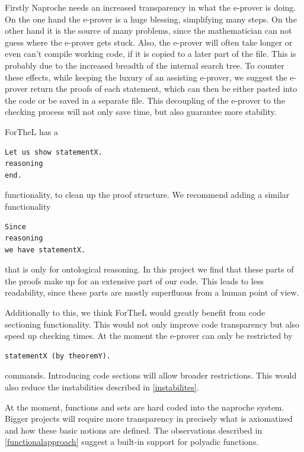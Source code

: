 \documentclass[11pt]{article}
\begin{document}
Firstly Naproche needs an increased transparency in what the e-prover is doing. On the one hand the e-prover is a huge blessing, simplifying many steps. On the other hand it is the source of many problems, since the mathematician can not guess where the e-prover gets stuck. Also, the e-prover will often take longer or even can't compile working code, if it is copied to a later part of the file. This is probably due to the increased breadth of the internal search tree. To counter these effects, while keeping the luxury of an assisting e-prover, we suggest the e-prover return the proofs of each statement, which can then be either pasted into the code or be saved in a separate file. This decoupling of the e-prover to the checking process will not only save time, but also guarantee more stability.

ForTheL has a 
\begin{lstlisting}
Let us show statementX.
reasoning
end.
\end{lstlisting} 
functionality, to clean up the proof structure. We recommend adding a similar functionality
\begin{lstlisting}
Since 
reasoning
we have statementX.
\end{lstlisting} 
that is only for ontological reasoning. In this project we find that these parts of the proofs make up for an extensive part of our code. This leads to less readability, since these parts are mostly superfluous from a human point of view.

Additionally to this, we think ForTheL would greatly benefit from code sectioning functionality. This would not only improve code transparency but also speed up checking times. At the moment the e-prover can only be restricted by 
\begin{lstlisting}
statementX (by theoremY).
\end{lstlisting}  commands. Introducing code sections will allow broader restrictions. This would also reduce the instabilities described in \ref{instabilites}.

At the moment, functions and sets are hard coded into the naproche system. Bigger projects will require more transparency in precisely what is axiomatized and how these basic notions are defined. The observations described in \ref{functionalapproach} suggest a built-in support for polyadic functions.
\end{document}
